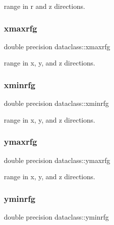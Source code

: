 range in r and z directions. 

\mbox{\label{namespacedataclass_a32b5b26da65d1b3507a36c17029a18ae}} 
\subsubsection{\texorpdfstring{xmaxrfg}{xmaxrfg}}
{\footnotesize\ttfamily double precision dataclass\+::xmaxrfg}



range in x, y, and z directions. 

\mbox{\label{namespacedataclass_ab5b5b652fce1e93de12accd3514958a0}} 
\subsubsection{\texorpdfstring{xminrfg}{xminrfg}}
{\footnotesize\ttfamily double precision dataclass\+::xminrfg}



range in x, y, and z directions. 

\mbox{\label{namespacedataclass_a79212aa125148748cc4bd5a11fff492f}} 
\subsubsection{\texorpdfstring{ymaxrfg}{ymaxrfg}}
{\footnotesize\ttfamily double precision dataclass\+::ymaxrfg}



range in x, y, and z directions. 

\mbox{\label{namespacedataclass_a5393ad3032e6f0311c62d03d468a6cf0}} 
\subsubsection{\texorpdfstring{yminrfg}{yminrfg}}
{\footnotesize\ttfamily double precision dataclass\+::yminrfg}



